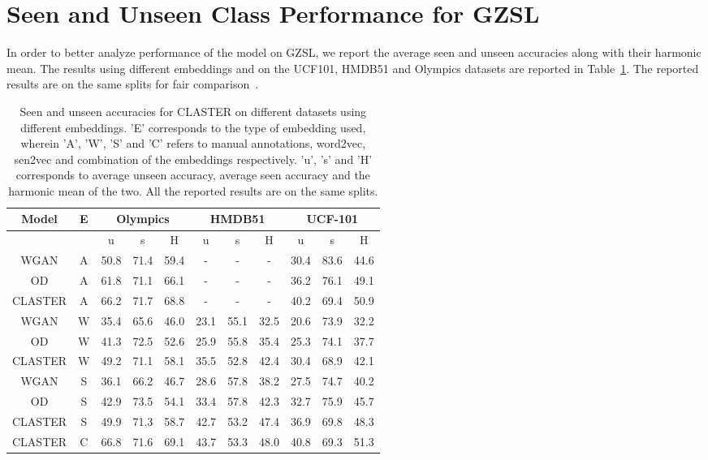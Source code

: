 \documentclass[runningheads]{llncs}
\begin{document}
\section{Seen and Unseen Class Performance for GZSL}
\label{sec:gzsl:seenunseen}

In order to better analyze performance of the model on GZSL, we report the average seen and unseen accuracies along with their harmonic mean. The results using different embeddings and on the UCF101, HMDB51 and Olympics datasets are reported in Table~\ref{tab:gzsl_vid}. The reported results are on the same splits for fair comparison~\cite{truze}.

\setlength{\tabcolsep}{1.3pt}
\begin{table}[htb]
\begin{center}
\begin{tabular}{| *{11}{c|} }
\hline
Model & E & \multicolumn{3}{c|}{Olympics} & \multicolumn{3}{c|}{HMDB51}& \multicolumn{3}{c|}{UCF-101}\\
\hline
& & u & s & H & u & s & H & u & s & H \\
\hline\hline
WGAN \cite{clswgan} & A & 50.8 & 71.4 & 59.4 & - & - & - & 30.4 & 83.6 & 44.6\\
OD \cite{OD} & A & 61.8 & 71.1 & 66.1 & - & - & - & 36.2 & 76.1 & 49.1 \\
CLASTER & A & 66.2 & 71.7 & 68.8 & - & - & - & 40.2 & 69.4 & 50.9 \\
\hline
WGAN \cite{clswgan} & W & 35.4 & 65.6 & 46.0 & 23.1 & 55.1 & 32.5 & 20.6 & 73.9 & 32.2\\
OD \cite{OD} & W & 41.3 & 72.5 & 52.6 & 25.9 & 55.8 & 35.4 & 25.3 & 74.1 & 37.7\\
CLASTER & W & 49.2 & 71.1 & 58.1 & 35.5 & 52.8 & 42.4 & 30.4 & 68.9 & 42.1 \\
\hline
WGAN \cite{clswgan} & S & 36.1 & 66.2 & 46.7 & 28.6 & 57.8 & 38.2 & 27.5 & 74.7 & 40.2\\
OD \cite{OD} & S & 42.9 & 73.5 & 54.1 & 33.4 & 57.8 & 42.3 & 32.7 & 75.9 & 45.7 \\
CLASTER & S & 49.9 & 71.3 & 58.7 & 42.7 & 53.2 & 47.4 & 36.9 & 69.8 & 48.3\\
\hline
CLASTER & C & 66.8 & 71.6 & 69.1 & 43.7 & 53.3 & 48.0 & 40.8 & 69.3 & 51.3\\
\hline
\end{tabular}
\end{center}
\caption{Seen and unseen accuracies for CLASTER on different datasets using different embeddings. 'E' corresponds to the type of embedding used, wherein 'A', 'W', 'S' and 'C' refers to manual annotations, word2vec, sen2vec and combination of the embeddings respectively. 'u', 's' and 'H' corresponds to average unseen accuracy, average seen accuracy and the harmonic mean of the two. All the reported results are on the same splits.} 
\label{tab:gzsl_vid}
\end{table}
\end{document}
